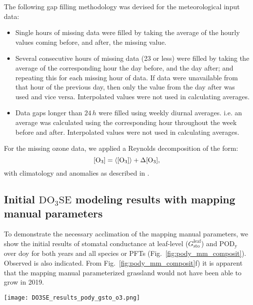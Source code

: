 \documentclass[bg, manuscript]{copernicus}
\begin{document}
The following gap filling methodology was devised for the meteorological input data:
\begin{itemize}
\item Single hours of missing data were filled by taking the average of the hourly values coming before, and after, the missing value.
\item Several consecutive hours of missing data (23 or less) were filled by taking the average of the corresponding hour the day before, and the day after; and repeating this for each missing hour of data. If data were unavailable from that hour of the previous day, then only the value from the day after was used and vice versa. Interpolated values were not used in calculating averages.
\item Data gaps longer than $24\,\unit{h}$ were filled using weekly diurnal averages. i.e. an average was calculated using the corresponding hour throughout the week before and after. Interpolated values were not used in calculating averages.
\end{itemize}

For the missing ozone data, we applied a Reynolds decomposition of the form:
\begin{equation}
  \chem{[O_3]} = \chem{\left<[O_3]\right>} + \chem{\Delta[O_3]},
  \label{eq:reynolds_decomp}
\end{equation}
with climatology \chem{\left<[O_3]\right>} and anomalies \chem{\Delta[O_3]} as described in \citet{ACPD:Falk2021}.

\subsection{Initial $\mathrm{DO_3SE}$ modeling results with mapping manual parameters}
To demonstrate the necessary acclimation of the mapping manual parameters, we show the initial results of stomatal conductance at leaf-level ($G_\mathrm{sto}^\mathrm{leaf}$) and $\mathrm{POD_y}$ over \unit{doy} for both years and all species or PFTs (Fig.~\ref{fig:pody_mm_composit}). Observed \chem{[O_3]} is also indicated. From Fig.~\ref{fig:pody_mm_composit}f) it is apparent that the mapping manual parameterized grassland would not have been able to grow in 2019.

\begin{figure*}[t]
  \texttt{[image: DO3SE\_results\_pody\_gsto\_o3.png]}
  \caption{$\mathrm{DO_3SE}$ modeling results for mapping manual default parameterization. $\mathrm{POD_y}$ is shown over day of year (\unit{doy}), March--October. A flux threshold $y=1\,\unit{nmol\,m^{-2}\,s^{-1}}$ per projected leaf area (PLA) has been chosen. \chem{[O_3]} are plotted on the same axis and scales as $G_\text{sto}^\text{leaf}$ but in units of $\unit{ppb}$. (a, b) deciduous tree; (c, d) coniferous tree; (e, f) perennial grassland. From left to right: 2018, 2019.}
  \label{fig:pody_mm_composit}
\end{figure*}
\end{document}
